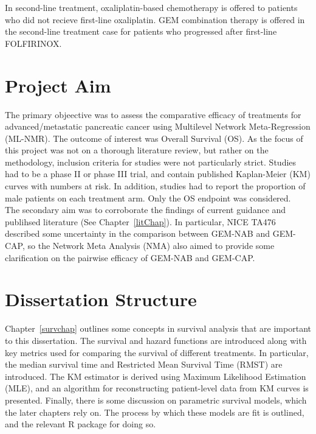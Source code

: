 In second-line treatment, oxaliplatin-based chemotherapy is offered to patients who did not recieve first-line oxaliplatin. GEM combination therapy is offered in the second-line treatment case for patients who progressed after first-line FOLFIRINOX.

\section{Project Aim}\label{sec:aims}
The primary objeective was to assess the comparative efficacy of treatments for advanced/metastatic pancreatic cancer using Multilevel Network Meta-Regression (ML-NMR). The outcome of interest was Overall Survival (OS). As the focus of this project was not on a thorough literature review, but rather on the methodology, inclusion criteria for studies were not particularly strict. Studies had to be a phase II or phase III trial, and contain published Kaplan-Meier (KM) curves with numbers at risk. In addition, studies had to report the proportion of male patients on each treatment arm. Only the OS endpoint was considered. \\

The secondary aim was to corroborate the findings of current guidance and publihsed literature (See Chapter~\ref{litChap}). In particular, NICE TA476~\cite{TA476} described some uncertainty in the comparison between GEM-NAB and GEM-CAP, so the Network Meta Analysis (NMA) also aimed to provide some clarification on the pairwise efficacy of GEM-NAB and GEM-CAP.  

\section{Dissertation Structure}
Chapter~\ref{survchap} outlines some concepts in survival analysis that are important to this dissertation. The survival and hazard functions are introduced along with key metrics used for comparing the survival of different treatments. In particular, the median survival time and Restricted Mean Survival Time (RMST) are introduced. The KM estimator is derived using Maximum Likelihood Estimation (MLE), and an algorithm for reconstructing patient-level data from KM curves is presented. Finally, there is some discussion on parametric survival models, which the later chapters rely on. The process by which these models are fit is outlined, and the relevant R package for doing so. \\

